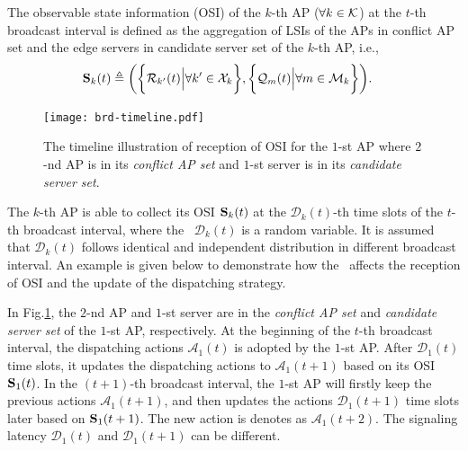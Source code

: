 \begin{definition}
    The observable state information (OSI) of the $k$-th AP ($\forall k\in\mathcal{K}$) at the $t$-th broadcast interval is defined as the aggregation of LSIs of the APs in {conflict AP set} and the edge servers in {candidate server set} of the $k$-th AP, i.e.,
    {\small
    \begin{align}
        \mathbf{S}_{k}(t) &\triangleq
        \bigg(
            \bigg\{\mathcal{R}_{k'}(t) \Big| \forall k'\in\mathcal{X}_{k}\bigg\},
            \bigg\{\mathcal{Q}_{m}(t) \Big| \forall m\in\mathcal{M}_{k}\bigg\}
        \bigg).
    \end{align}
    }%
    \label{def:OSI}
\end{definition}

\begin{figure}[t]
    \centering
    \texttt{[image: brd-timeline.pdf]}
    \caption{The timeline illustration of reception of OSI for the $1$-st AP where $2$-nd AP is in its \emph{conflict AP set} and $1$-st server is in its \emph{candidate server set}.}
    \label{fig:brd_timeline}
\end{figure}

The $k$-th AP is able to collect its OSI $\mathbf{S}_{k}(t)$ at the $\mathcal{D}_{k}(t)$-th time slots of the $t$-th broadcast interval, where the \emph{\brlatency}~$\mathcal{D}_{k}(t)$ is a random variable.
It is assumed that $\mathcal{D}_{k}(t)$ follows identical and independent distribution in different broadcast interval.
An example is given below to demonstrate how the \brlatency~affects the reception of OSI and the update of the dispatching strategy.

\begin{example}
    In Fig.\ref{fig:brd_timeline}, the $2$-nd AP and $1$-st server are in the \emph{conflict AP set} and \emph{candidate server set} of the $1$-st AP, respectively.
    At the beginning of the $t$-th broadcast interval, the dispatching actions $\mathcal{A}_{1}(t)$ is adopted by the $1$-st AP.
    After $\mathcal{D}_{1}(t)$ time slots, it updates the dispatching actions to $\mathcal{A}_{1}(t+1)$ based on its OSI $\mathbf{S}_{1}(t)$.
    In the $(t+1)$-th broadcast interval, the $1$-st AP will firstly keep the previous actions $\mathcal{A}_{1}(t+1)$, and then updates the actions $\mathcal{D}_{1}(t+1)$ time slots later based on $\mathbf{S}_{1}(t+1)$. The new action is denotes as $\mathcal{A}_{1}(t+2)$.
    The signaling latency $\mathcal{D}_1(t)$ and $\mathcal{D}_1(t+1)$ can be different.
\end{example}

